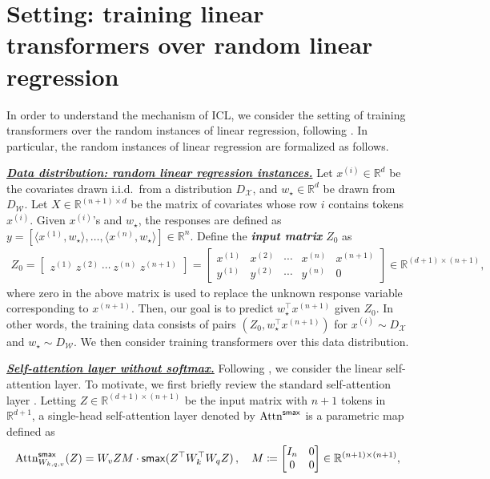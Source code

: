 \documentclass{article}
\newcommand{\R}{\mathbb{R}}
\newcommand{\softatt}{ \mathrm{Attn}^{\sf smax}}
\renewcommand{\aa}{M}
\newcommand{\wstar}{w_\star}
\newcommand{\tz}[1]{{z^{(#1)}}}
\newcommand{\tx}[1]{x^{(#1)}}
\newcommand{\ty}[1]{y^{(#1)}}
\newcommand{\emphh}[1]{\textbf{\emph{#1}}}
\begin{document}
 

\section{Setting: training linear transformers over random linear regression}  

\label{sec:problem} 

In order to understand the mechanism of ICL, we consider the setting of training transformers over the random instances of linear regression, following \citep{garg2022can,akyurek2022learning,von2022transformers}.
In particular, the random instances of linear regression are formalized as follows.

\underline{\emphh{Data distribution: random linear regression instances.}}
Let  ${\tx{i}} \in \R^d$  be the covariates drawn i.i.d.\ from a distribution $D_{\mathcal{X}}$, and $\wstar\in \R^d$ be drawn from  $D_{\mathcal{W}}$.
Let $X \in \R^{(n+1)\times d}$ be the matrix of covariates  whose row $i$ contains tokens ${\tx{i}}$.  
Given $\tx{i}$'s and $\wstar$, the responses are defined as $y = [ \langle\tx{1}, \wstar \rangle,\dots,  \langle\tx{n},\wstar \rangle] \in \R^n$. Define the \emphh{input matrix} $Z_0$ as
\begin{align}
\label{d:Z_0}
Z_0 = \begin{bmatrix}
\tz{1} \ \tz{2} \ \cdots \ \tz{n}  \ \tz{n+1}
\end{bmatrix} = \begin{bmatrix}
\tx{1} & \tx{2} & \cdots & \tx{n} &\tx{n+1} \\ 
\ty{1} & \ty{2} & \cdots &\ty{n}& 0
\end{bmatrix} \in \R^{(d+1) \times (n+1)},
\end{align}
where zero in the above matrix is used to replace the unknown response variable corresponding to $\tx{n+1}$.  
Then, our goal is to predict  $\wstar^\top \tx{n+1}$ given $Z_0$. 
In other words, the training data consists of pairs $(Z_0, \wstar^\top \tx{n+1})$ for $\tx{i}\sim D_{\mathcal{X}}$ and 
$\wstar \sim D_{\mathcal{W}}$.
We then consider training transformers over this data distribution.

\underline{\emphh{Self-attention layer without softmax.}}
Following \citep{schlag2021linear,von2022transformers}, we consider the linear self-attention layer.
To motivate, we first briefly review the standard self-attention layer \citep{vaswani2017attention}. Letting  $Z\in \R^{(d+1) \times (n+1)}$ be the input matrix with $n+1$ tokens in $\R^{d+1}$, a single-head self-attention layer denoted by $\softatt$ is a parametric map defined as
\begin{align} \label{eq:softmax}
\softatt_{W_{k,q,v}}(Z) =  W_v Z \aa  \cdot {\sf smax}(Z^\top W_k^\top W_q Z)\,, \quad \aa \coloneqq \begin{bmatrix} I_n & 0 \\0 & 0 \end{bmatrix} \in \R^{(n+1) \times (n+1)},
\end{align}
\end{document}
